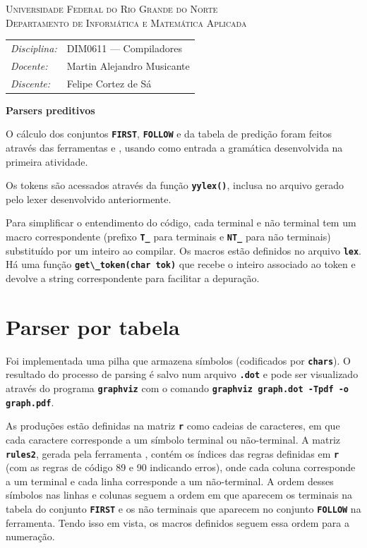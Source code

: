 \documentclass[12pt, a4paper]{article}
\newcommand{\ic}[1]{\textbf{\lstinline{#1}}}
\begin{document}
\begin{center}
    \textsc{Universidade Federal do Rio Grande do Norte} \\
    \textsc{Departamento de Informática e Matemática Aplicada}
\end{center}

\bigskip

\begin{tabular}{@{}ll@{}}
    \emph{Disciplina:} & DIM0611 --- Compiladores \\
    \emph{Docente:}    & Martin Alejandro Musicante \\
    \emph{Discente:}   & Felipe Cortez de Sá \\
\end{tabular}

\bigskip

\begin{center}
\large \textbf{Parsers preditivos}
\end{center}

O cálculo dos conjuntos \ic{FIRST}, \ic{FOLLOW} e da tabela de predição foram
feitos através das ferramentas \cite{jsmachines} e \cite{hackingoff},
usando como entrada a gramática desenvolvida na primeira atividade.

Os tokens são acessados através da função \ic{yylex()}, inclusa no arquivo
gerado pelo lexer desenvolvido anteriormente.

Para simplificar o entendimento do código, cada terminal e não terminal tem um
macro correspondente (prefixo \ic{T_} para terminais e \ic{NT_} para não
terminais) substituído por um inteiro ao compilar. Os macros estão definidos no
arquivo \ic{lex}. Há uma função \ic{get\_token(char tok)} que recebe o inteiro
associado ao token e devolve a string correspondente para facilitar a
depuração.

\section{Parser por tabela}
Foi implementada uma pilha que armazena símbolos (codificados por \ic{chars}).
O resultado do processo de parsing é salvo num arquivo \ic{.dot} e pode ser
visualizado através do programa \ic{graphviz} \cite{graphviz} com o comando \ic{graphviz
graph.dot -Tpdf -o graph.pdf}.

As produções estão definidas na matriz \ic{r} como cadeias de caracteres, em
que cada caractere corresponde a um símbolo terminal ou não-terminal. A matriz
\ic{rules2}, gerada pela ferramenta \cite{hackingoff}, contém os índices das
regras definidas em \ic{r} (com as regras de código 89 e 90 indicando erros),
onde cada coluna corresponde a um terminal e cada linha corresponde a um
não-terminal. A ordem desses símbolos nas linhas e colunas seguem a ordem em
que aparecem os terminais na tabela do conjunto \ic{FIRST} e os não terminais
que aparecem no conjunto \ic{FOLLOW} na ferramenta. Tendo isso em vista, os
macros definidos seguem essa ordem para a numeração.
\end{document}
